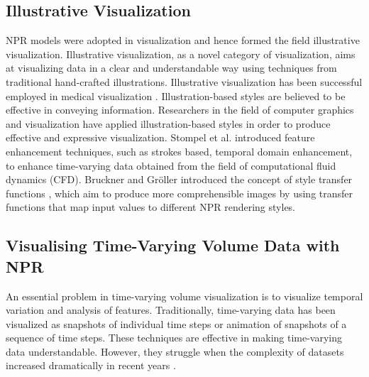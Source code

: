 
\subsection{Illustrative Visualization}
NPR models were adopted in visualization and hence formed the field illustrative visualization.
Illustrative visualization, as a novel category of visualization, aims at visualizing data in a clear and understandable way using techniques from traditional hand-crafted illustrations. Illustrative visualization has been successful employed in medical visualization \cite{svakhine_illustration_2005} \cite{viola_importance-driven_2005}.
Illustration-based styles are believed to be effective in conveying information. Researchers in the field of computer graphics and visualization have applied illustration-based styles in order to produce effective and expressive visualization. Stompel et al. \cite{stompel_visualization_2002} introduced feature enhancement techniques, such as strokes based, temporal domain enhancement, to enhance time-varying data obtained from the field of computational fluid dynamics (CFD).
Bruckner and Gr{\"o}ller introduced the concept of style transfer functions \cite{bruckner_style_2007}, which aim to produce more comprehensible images by using transfer functions that map input values to different NPR rendering styles.

\subsection{Visualising Time-Varying Volume Data with NPR}
An essential problem in time-varying volume visualization is to visualize temporal variation and analysis of features. Traditionally, time-varying data has been visualized as snapshots of individual time steps or animation of snapshots of a sequence of time steps. These techniques are effective in making time-varying data understandable. However, they struggle when the complexity of datasets increased dramatically in recent years \cite{brambilla_illustrative_2012}.

